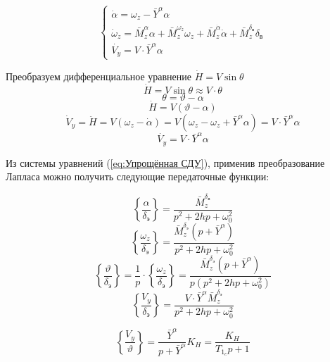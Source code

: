 \begin{equation}
    \label{eq:Упрощённая СДУ}
    \begin{cases}
        \dot{\alpha}=\omega_z-\bar{Y}^{\alpha} \alpha \\
        \dot{\omega}_z=\bar{M}_z^{\alpha} \alpha+\bar{M}_z^{\omega_z} \omega_z +\bar{M}_z^{\dot{\alpha}} \dot{\alpha}+\bar{M}_z^{\delta_{\text{в}}} \delta_{\text{в}} \\
        \dot{V_y}=V \cdot \bar{Y}^{\alpha} \alpha
    \end{cases}
\end{equation}

Преобразуем дифференциальное уравнение $\dot{H}=V\sin{\theta}$ 
$$\dot{H}=V\sin{\theta} \approx V \cdot \theta $$
$$\theta = \vartheta - \alpha$$
$$\dot{H}=V(\vartheta - \alpha)$$
$$\dot{V}_y =\ddot{H}=V(\omega_z - \dot{\alpha})=V(\omega_z-\omega_z+\bar{Y}^{\alpha} \alpha)=V \cdot \bar{Y}^{\alpha} \alpha$$
\begin{equation}
    \dot{V_y}=V \cdot \bar{Y}^{\alpha} \alpha
\end{equation}

Из системы уравнений (\ref{eq:Упрощённая СДУ}), применив преобразование Лапласа можно получить следующие передаточные функции:

\begin{equation}
    \label{eq:ПФ угл атаки}
   \left \{ \frac{\alpha}{\delta_\text{э}} \right \}
    =\frac{\bar{M}_z^{\delta_{\text{в}}}}{p^2+2hp+\omega_0^2}
\end{equation}
\begin{equation}
    \label{eq:ПФ угловой скорости тангажа}
   \left \{ \frac{\omega_z}{\delta_\text{э}} \right \}
    =\frac{\bar{M}_z^{\delta_{\text{э}}}(p+\bar{Y}^{\alpha})}{p^2+2hp+\omega_0^2}
\end{equation}
\begin{equation}
    \label{eq:ПФ угл тангажа}
    \left \{ \frac{\vartheta}{\delta_\text{э}} \right \}=\frac{1}{p} \cdot \left \{ \frac{\omega_z}{\delta_\text{э}} \right \}=\frac{\bar{M}_z^{\delta_{\text{э}}}(p+\bar{Y}^{\alpha})}{ p (p^2+2hp+\omega_0^2)}
\end{equation}
\begin{equation}
    \label{eq:ПФ вертикальная скорость}
   \left \{ \frac{V_y}{\delta_\text{э}} \right \}
    = \frac{V \cdot \bar{Y}^{\alpha}\bar{M}_z^{\delta_{\text{э}}}}{p^2+2hp+\omega_0^2}
\end{equation}

\begin{equation}
    \label{eq:ПФ вертикальной скорости по углу тангажа}
   \left \{ \frac{V_y}{\vartheta} \right \}
    = \frac{\bar{Y}^{\alpha}}{p+\bar{Y}^{\alpha}}K_H =  \frac{K_H}{T_1_c p+1}
\end{equation}

